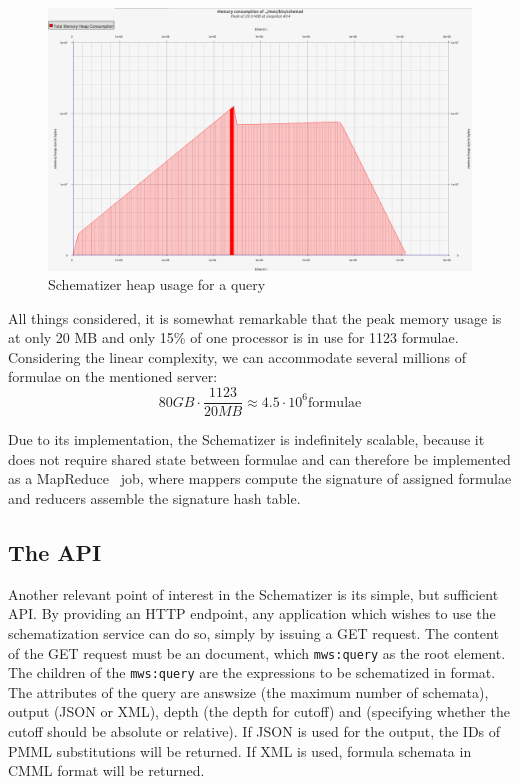 \begin{figure}[ht]\centering
    \includegraphics[width=12.8cm]{img/heapUsage.png}
    \caption{Schematizer heap usage for a query}\label{fig:heap_usage}
\end{figure}
\FloatBarrier

All things considered, it is somewhat remarkable that the peak memory usage
is at only 20 MB and only 15\% of one processor is in use for 1123 formulae.
Considering the linear complexity, we can accommodate several millions of
formulae on the mentioned server:
$$80 GB \cdot \frac{1123}{20 MB} \approx 4.5 \cdot {10}^{6} \text{formulae}$$

Due to its implementation, the Schematizer is indefinitely scalable, because it
does not require shared state between formulae and can therefore be implemented
as a MapReduce~\cite{mapreduce} job, where mappers compute the signature of
assigned formulae and reducers assemble the signature hash table.

\subsection{The API}\label{subsec:schematizer_api}
Another relevant point of interest in the Schematizer is its simple, but
sufficient API. By providing an HTTP endpoint, any application which wishes to
use the schematization service can do so, simply by issuing a GET request.
The content of the GET request must be an \xml document, which \verb|mws:query|
as the root element. The children of the \verb|mws:query| are the expressions
to be schematized in \cmml format. The attributes of the query are
\textsf{answsize} (the maximum number of schemata), \textsf{output} (JSON or
XML), \textsf{depth} (the depth for cutoff) and 
(specifying whether the cutoff should be absolute or relative).  If JSON is
used for the output, the IDs of PMML substitutions will be returned. If XML is
used, formula schemata in CMML format will be returned.

